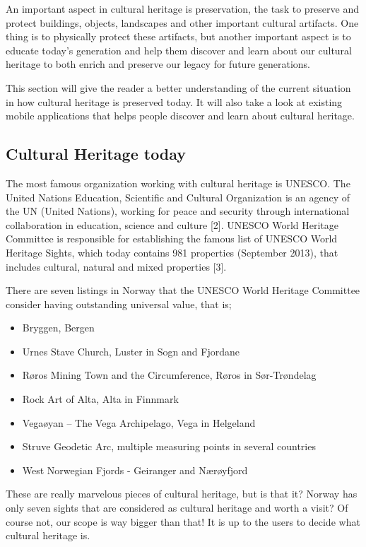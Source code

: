 \documentclass[11pt]{book}
\begin{document}
An important aspect in cultural heritage is preservation, the task to preserve and protect buildings, objects, landscapes and other important cultural artifacts. One thing is to physically protect these artifacts, but another important aspect is to educate today's generation and help them discover and learn about our cultural heritage to both enrich and preserve our legacy for future generations.

This section will give the reader a better understanding of the current situation in how cultural heritage is preserved today. It will also take a look at existing mobile applications that helps people discover and learn about cultural heritage.

\subsection{Cultural Heritage today}
The most famous organization working with cultural heritage is UNESCO. The United Nations Education, Scientific and Cultural Organization is an agency of the UN (United Nations), working for peace and security through international collaboration in education, science and culture [2]. UNESCO World Heritage Committee is responsible for establishing  the famous list of UNESCO World Heritage Sights, which today contains 981 properties (September 2013), that includes cultural, natural and mixed properties [3]. 

There are seven listings in Norway that the UNESCO World Heritage Committee consider having outstanding universal value, that is;

\begin{itemize}
  \item Bryggen, Bergen
  \item Urnes Stave Church, Luster in Sogn and Fjordane
  \item Røros Mining Town and the Circumference, Røros in Sør-Trøndelag
  \item Rock Art of Alta, Alta in Finnmark
  \item Vegaøyan -- The Vega Archipelago, Vega in Helgeland
  \item Struve Geodetic Arc, multiple measuring points in several countries
  \item West Norwegian Fjords - Geiranger and Nærøyfjord
\end{itemize}

These are really marvelous pieces of cultural heritage, but is that it? Norway has only seven sights that are considered as cultural heritage and worth a visit? Of course not, our scope is way bigger than that! It is up to the users to decide what cultural heritage is.
\end{document}
